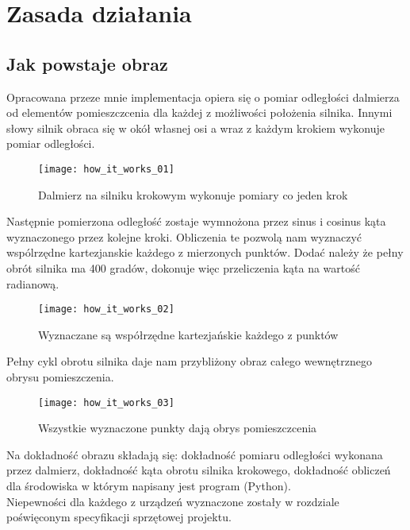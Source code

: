 \section {Zasada działania}

\subsection {Jak powstaje obraz}

Opracowana przeze mnie implementacja opiera się o pomiar odległości dalmierza od elementów pomieszczcenia dla każdej z możliwości położenia silnika. Innymi słowy silnik obraca się w okół własnej osi a wraz z każdym krokiem wykonuje pomiar odległości.\\

\begin{figure}[h]
    \centering
    \texttt{[image: how\_it\_works\_01]}
    \caption{Dalmierz na silniku krokowym wykonuje pomiary co jeden krok}
    \label{fig:how_it_works_01}
\end{figure}

Następnie pomierzona odległość zostaje wymnożona przez sinus i cosinus kąta wyznaczonego przez kolejne kroki. Obliczenia te pozwolą nam wyznaczyć wspólrzędne kartezjanskie każdego z mierzonych punktów. Dodać należy że pełny obrót silnika ma 400 gradów, dokonuje więc przeliczenia kąta na wartość radianową.\\

\begin{figure}[h]
    \centering
    \texttt{[image: how\_it\_works\_02]}
    \caption{Wyznaczane są współrzędne kartezjańskie każdego z punktów}
    \label{fig:how_it_works_02}
\end{figure}

Pełny cykl obrotu silnika daje nam przybliżony obraz całego wewnętrznego obrysu pomieszczenia.\\

\begin{figure}[h]
    \centering
    \texttt{[image: how\_it\_works\_03]}
    \caption{Wszystkie wyznaczone punkty dają obrys pomieszczcenia}
    \label{fig:how_it_works_03}
\end{figure}

Na dokładność obrazu składają się: dokładność pomiaru odległości wykonana przez dalmierz, dokładność kąta obrotu silnika krokowego, dokładność obliczeń dla środowiska w którym napisany jest program (Python).\\

Niepewności dla każdego z urządzeń wyznaczone zostały w rozdziale poświęconym specyfikacji sprzętowej projektu.\\
